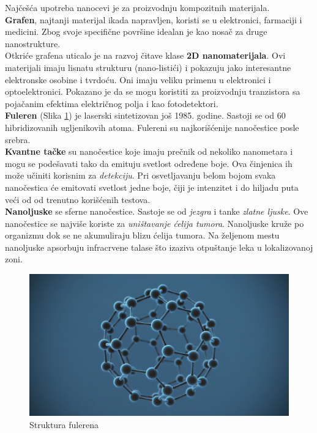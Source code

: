 \documentclass[a4paper]{article}
\begin{document}
{Najčešća upotreba nanocevi je za proizvodnju kompozitnih materijala.\\

\textbf{Grafen}, najtanji materijal ikada napravljen, koristi se u elektronici, farmaciji i medicini. Zbog svoje specifične površine idealan je kao nosač za druge nanostrukture.\\

Otkriće grafena uticalo je na razvoj čitave klase \textbf{2D nanomaterijala}. Ovi materijali imaju lisnatu strukturu (nano-listići) i pokazuju jako interesantne elektronske osobine i tvrdoću. Oni imaju veliku primenu u elektronici i optoelektronici. Pokazano je da se mogu koristiti za proizvodnju tranzistora sa pojačanim efektima električnog polja i kao fotodetektori.\\

\textbf{Fuleren} (Slika \ref{slika_fuleren}) je laserski sintetizovan još 1985. godine. Sastoji se od 60 hibridizovanih ugljenikovih atoma. Fulereni su najkorišćenije nanočestice posle srebra.\\ 

\textbf{Kvantne tačke} su nanočestice koje imaju prečnik od nekoliko nanometara i mogu se podešavati tako da emituju svetlost određene boje. Ova činjenica ih može učiniti korisnim za \emph{detekciju}. Pri osvetljavanju belom bojom svaka nanočestica će emitovati svetlost jedne boje, čiji je intenzitet i do hiljadu puta veći od od trenutno korišćenih testova.\\

\textbf{Nanoljuske} se sferne nanočestice. Sastoje se od \emph{jezgra} i tanke \emph{zlatne ljuske}. Ove nanočestice se najviše koriste za \emph{uništavanje ćelija tumora}. Nanoljuske kruže po organizmu dok se ne akumuliraju blizu ćelija tumora. Na željenom mestu nanoljuske apsorbuju infracrvene talase što izaziva otpuštanje leka u lokalizovanoj zoni.\\


\begin{figure}[H]
    \centering
    \includegraphics[width=.4\textwidth]{slika 3.jpg}
    \caption{Struktura fulerena}
    \label{slika_fuleren}
\end{figure}

}
\end{document}
